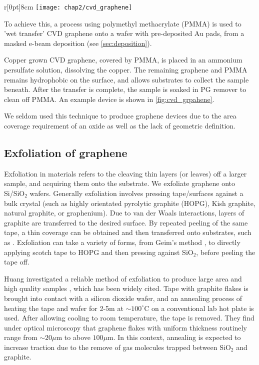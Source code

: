 \documentclass[../../Matt_Gebert_Honours_Thesis.tex]{subfiles}
\begin{document}
	\begin{wrapfigure}[17]{r}[0pt]{8cm}
		\centering
		\vspace{-0.5cm}
		\texttt{[image: chap2/cvd\_graphene]}
		\caption[CVD graphene grown on Cu transferred onto \silicondioxide{} and Au pads.]{CVD graphene grown on Cu transferred onto \silicondioxide{} and Au pads. The contrast differences due to the autoexposure of the camera software.} \label{fig:cvd_grpahene} 
	\end{wrapfigure}

	To achieve this, a process\cite{zheng_direct_2017} using polymethyl methacrylate (PMMA) is used to 'wet transfer' CVD graphene onto a \silicondioxide{} wafer with pre-deposited Au pads, from a masked e-beam deposition (see \cref{sec:deposition}). 
	
	Copper grown CVD graphene, covered by PMMA, is placed in an ammonium persulfate solution, dissolving the copper. The remaining graphene and PMMA remains hydrophobic on the surface, and allows substrates to collect the sample beneath. After the transfer is complete, the sample is soaked in PG remover to clean off PMMA. An example device is shown in \cref{fig:cvd_grpahene}. 
	
	We seldom used this technique to produce graphene devices due to the area coverage requirement of an oxide as well as the lack of geometric definition.
	
	\subsection{Exfoliation of graphene}\label{sec:exfoliation}
	Exfoliation in materials refers to the cleaving thin layers (or leaves) off a larger sample, and acquiring them onto the substrate. We exfoliate graphene onto Si/SiO$_2$ wafers. 
	Generally exfoliation involves pressing tape/surfaces against a bulk crystal (such as highly orientated pyrolytic graphite (HOPG), Kish graphite, natural graphite, or graphenium). Due to van der Waals interactions, layers of graphite are transferred to the desired surface. By repeated peeling of the same tape, a thin coverage can be obtained and then transferred onto substrates, such as \silicondioxide.
	Exfoliation can take a variety of forms, from Geim's method \cite{novoselov_two-dimensional_2005}, to directly applying scotch tape to HOPG and then pressing against SiO$_2$, before peeling the tape off.
	
	Huang \etal investigated a reliable method of exfoliation to produce large area and high quality samples \cite{huang_reliable_2015}, which has been widely cited. Tape with graphite flakes is brought into contact with a silicon dioxide wafer, and an annealing process of heating the tape and wafer for 2-5m at $\sim 100^\circ$C on a conventional lab hot plate is used. After allowing cooling to room temperature, the tape is removed. They find under optical microscopy that graphene flakes with uniform thickness routinely range from $\sim 20\mu$m to above $100\mu$m. In this context, annealing is expected to increase traction due to the remove of gas molecules trapped between SiO$_2$ and graphite.\newline 
	
\end{document}
